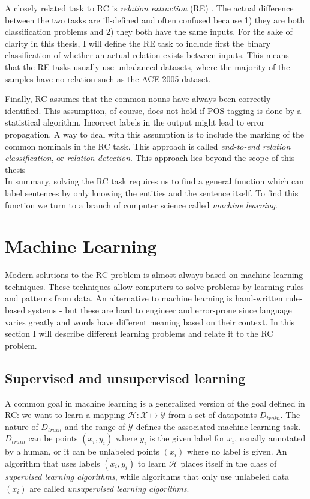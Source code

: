 A closely related task to RC is \emph{relation extraction} (RE) . The actual difference between the two tasks are ill-defined and often confused because 1) they are both classification problems and 2) they both have the same inputs. For the sake of clarity in this thesis, I will define the RE task to include first the binary classification of whether an actual relation exists between inputs. This means that the RE tasks usually use unbalanced datasets, where the majority of the samples have no relation such as the ACE 2005 dataset\cite{ace2005}. 

Finally, RC assumes that the common nouns have always been correctly identified. This assumption, of course, does not hold if POS-tagging is done by a statistical algorithm. Incorrect labels in the output might lead to error propagation.
A way to deal with this assumption is to include the marking of the common nominals in the RC task. This approach is called \emph{end-to-end relation classification}, or \emph{relation detection}. This approach lies beyond the scope of this thesis\\





In summary, solving the RC task requires us to find a general function which can label sentences by only knowing the entities and the sentence itself. To find this function we turn to a branch of computer science called \emph{machine learning}.



\section{Machine Learning}

Modern solutions to the RC problem is almost always based on machine learning techniques. These techniques allow computers to solve problems by learning rules and patterns from data. An alternative to machine learning is hand-written rule-based systems - but these are hard to engineer and error-prone since language varies greatly and words have different meaning based on their context. In this section I will describe different learning problems and relate it to the RC problem.  


\subsection{Supervised and unsupervised learning}
A common goal in machine learning is a generalized version of the goal defined in RC: we want to learn a mapping $\mathcal{H} : \mathcal{X} \mapsto \mathcal{Y}$ from a set of datapoints $D_{train}$. The nature of $D_{train}$ and the range of $\mathcal{Y}$ defines the associated machine learning task\cite{semisupervised_book}. $D_{train}$ can be points $(x_i, y_i)$ where $y_i$ is the given label for $x_i$, usually annotated by a human, or it can be unlabeled points $(x_i)$ where no label is given. An algorithm that uses labels $(x_i, y_i)$ to learn $\mathcal{H}$ places itself in the class of \emph{supervised learning algorithms}, while algorithms that only use unlabeled data $(x_i)$ are called \emph{unsupervised learning algorithms}. 

